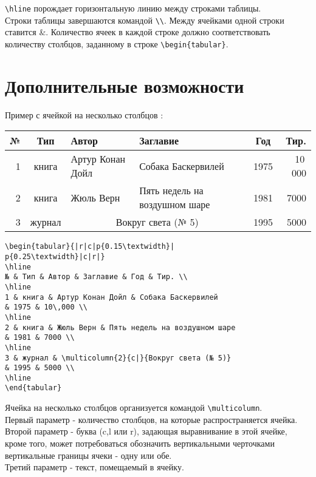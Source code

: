 \verb|\hline| порождает горизонтальную линию между строками таблицы.\\Строки таблицы завершаются командой \verb|\\|. Между ячейками одной строки ставится \&. Количество ячеек в каждой строке должно соответствовать количеству столбцов, заданному в строке  \verb|\begin{tabular}|.

\section{Дополнительные возможности}

Пример с ячейкой на несколько столбцов \cite[][с.~47]{__2010}:


\begin{tabular}{|r|c|p{}|
p{}|c|r|}
\hline 
№ & Тип & Автор & Заглавие & Год & Тир. \\ 
\hline
1 & книга & Артур Конан Дойл & Собака Баскервилей
& 1975 & 10\,000 \\ \hline
2 & книга & Жюль Верн & Пять недель на воздушном шаре
& 1981 & 7000 \\ \hline
3 & журнал & \multicolumn{2}{c|}{Вокруг света (№ 5)}
& 1995 & 5000 \\ \hline
\end{tabular}

\begin{verbatim}
\begin{tabular}{|r|c|p{0.15\textwidth}|
p{0.25\textwidth}|c|r|}
\hline 
№ & Тип & Автор & Заглавие & Год & Тир. \\ 
\hline
1 & книга & Артур Конан Дойл & Собака Баскервилей
& 1975 & 10\,000 \\ 
\hline
2 & книга & Жюль Верн & Пять недель на воздушном шаре
& 1981 & 7000 \\ 
\hline
3 & журнал & \multicolumn{2}{c|}{Вокруг света (№ 5)}
& 1995 & 5000 \\ 
\hline
\end{tabular}
\end{verbatim}

Ячейка на несколько столбцов организуется командой \verb|\multicolumn|.\\
Первый параметр - количество столбцов, на которые распространяется ячейка.\\
Второй параметр - буква (c,l или r), задающая выравнивание в этой ячейке, кроме того, может потребоваться обозначить  вертикальными черточками вертикальные границы ячеки - одну или обе.\\
Третий параметр - текст, помещаемый в ячейку.

